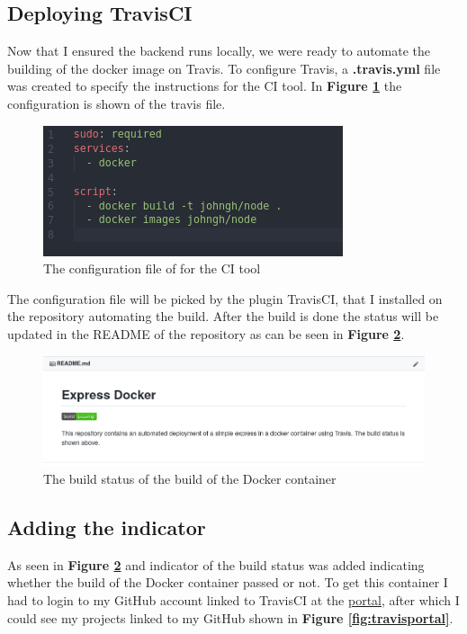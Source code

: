 \documentclass{paper}
\begin{document}
    \subsection{Deploying TravisCI}
    {Now that I ensured the backend runs locally, we were ready to automate the building 
    of the docker image on Travis. To configure Travis, a \textbf{.travis.yml} file was created to specify the instructions 
    for the CI tool. In \textbf{Figure \ref{fig:travis}} the configuration is shown of the travis file.
    \begin{figure}[!h]
        \centering
        \includegraphics[scale=3, pagebox=artbox]{Images/travis.png}
        \caption{The configuration file of for the CI tool}
        \label{fig:travis}
    \end{figure}
    \newline
    The configuration file will be picked by the plugin TravisCI, that I installed on the repository automating the build. After
    the build is done the status will be updated in the README of the repository as can be seen in \textbf{Figure \ref{fig:result}}.
    \begin{figure}[!h]
        \centering
        \includegraphics[scale=1.4, pagebox=artbox]{Images/README.png}
        \caption{The build status of the build of the Docker container}
        \label{fig:result}
    \end{figure}
    \newpage
    \subsection{Adding the indicator}
    {As seen in \textbf{Figure \ref{fig:result}} and indicator of the build status was added indicating whether
    the build of the Docker container passed or not. To get this container I had to login to my GitHub account linked to TravisCI
    at the \href{https://travis-ci.com/}{portal}, after which I could see my projects linked to my GitHub shown in 
    \textbf{Figure \ref{fig:travisportal}}.

}}
\end{document}
